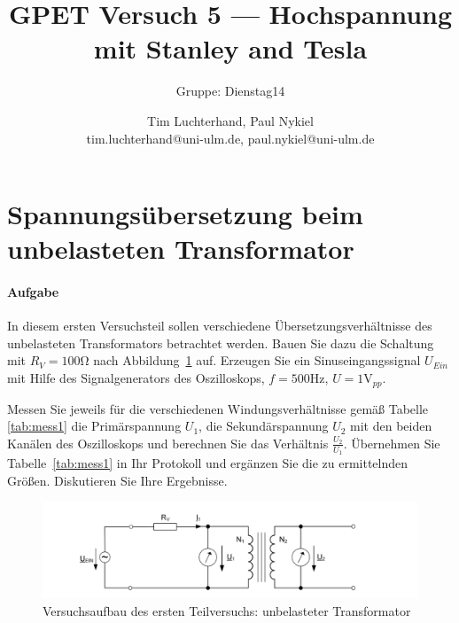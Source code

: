 \documentclass[10pt]{scrreprt}
\author{Tim Luchterhand, Paul Nykiel \protect\\ tim.luchterhand@uni-ulm.de, paul.nykiel@uni-ulm.de}
\title{GPET Versuch 5 --- Hochspannung mit Stanley and Tesla}
\subtitle{Gruppe: Dienstag14}
\begin{document}
        \maketitle
        \section{Spannungsübersetzung beim unbelasteten Transformator}
        \paragraph{Aufgabe}
        In diesem ersten Versuchsteil sollen verschiedene Übersetzungsverhältnisse des
        unbelasteten Transformators betrachtet werden. Bauen Sie dazu die Schaltung mit $R_V = 100\si{\ohm}$
        nach Abbildung~\ref{fig:abb8} auf. Erzeugen Sie ein Sinuseingangssignal $U_{Ein}$ mit Hilfe des Signalgenerators
        des Oszilloskops, $f = 500\si{\hertz}$, $U = 1\si{\volt}_{pp}$.

        \vspace{0.5cm}

        Messen Sie jeweils für die verschiedenen Windungsverhältnisse gemäß Tabelle \ref{tab:mess1} die
        Primärspannung $U_1$, die Sekundärspannung $U_2$ mit den beiden Kanälen des Oszilloskops und
        berechnen Sie das Verhältnis $\frac{U_2}{U_1}$. Übernehmen Sie Tabelle~\ref{tab:mess1} in Ihr Protokoll und ergänzen
        Sie die zu ermittelnden Größen. Diskutieren Sie Ihre Ergebnisse.

        \begin{center}
            \begin{figure}[H]
                \includegraphics[width=\textwidth]{aufgabenBilder/abbildung8.png}
                \caption{Versuchsaufbau des ersten Teilversuchs: unbelasteter Transformator}
                \label{fig:abb8}
            \end{figure}
        \end{center}
\end{document}
